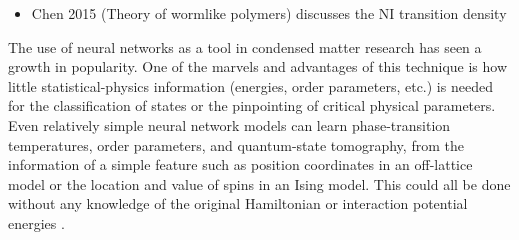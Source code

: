 
\begin{itemize}
	\item Chen 2015 (Theory of wormlike polymers) discusses the NI transition density
\end{itemize}

The use of neural networks as a tool in condensed matter research has seen a growth in popularity. One of the marvels and advantages of this technique is how little statistical-physics information (energies, order parameters, etc.) is needed for the classification of states or the pinpointing of critical physical parameters.
Even relatively simple neural network models can learn phase-transition temperatures, order parameters, and quantum-state tomography, from the information of a simple feature such as position coordinates in an off-lattice model or the location and value of spins in an Ising model. This could all be done without any knowledge of the original Hamiltonian or interaction potential energies \cite{torlaiboltzmann,carras,wei,wetzel,torlai,morningstar,beach}.


